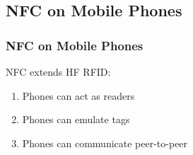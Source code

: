 \documentclass[unknownkeysallowed]{beamer}
\begin{document}



\subsection{NFC on Mobile Phones}

\begin{frame}
\frametitle{NFC on Mobile Phones}
  \begin{center}
  \begin{minipage}{.7\textwidth}
  \begin{block}{NFC extends HF RFID:}
		\begin{enumerate}
		  \item{Phones can act as readers}
		  \item{Phones can emulate tags}
      \item{Phones can communicate peer-to-peer}
   	\end{enumerate}
  \end{block}
  \end{minipage}
  \end{center}
\end{frame}
\end{document}

